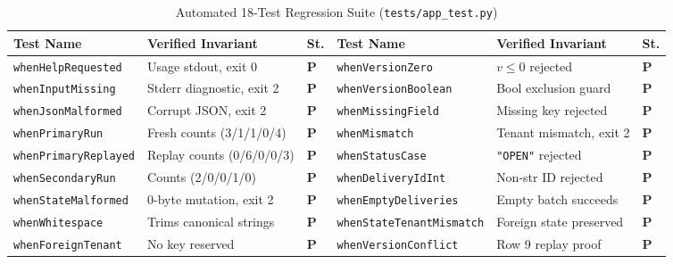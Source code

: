 \documentclass[10pt,a4paper]{article}
\begin{document}
\begin{table}[htbp]
\centering\footnotesize
\renewcommand{\arraystretch}{1.1}
\caption{Automated 18-Test Regression Suite (\texttt{tests/app\_test.py})}
\label{tab:test_results}
\begin{tabularx}{\textwidth}{@{}lXl|lXl@{}}
\toprule
\textbf{Test Name} & \textbf{Verified Invariant} & \textbf{St.} & \textbf{Test Name} & \textbf{Verified Invariant} & \textbf{St.} \\ \midrule
\texttt{whenHelpRequested} & Usage stdout, exit 0 & \textcolor{ggreen}{\textbf{P}} & \texttt{whenVersionZero} & $v \le 0$ rejected & \textcolor{ggreen}{\textbf{P}} \\
\texttt{whenInputMissing} & Stderr diagnostic, exit 2 & \textcolor{ggreen}{\textbf{P}} & \texttt{whenVersionBoolean} & Bool exclusion guard & \textcolor{ggreen}{\textbf{P}} \\
\texttt{whenJsonMalformed} & Corrupt JSON, exit 2 & \textcolor{ggreen}{\textbf{P}} & \texttt{whenMissingField} & Missing key rejected & \textcolor{ggreen}{\textbf{P}} \\
\texttt{whenPrimaryRun} & Fresh counts (3/1/1/0/4) & \textcolor{ggreen}{\textbf{P}} & \texttt{whenMismatch} & Tenant mismatch, exit 2 & \textcolor{ggreen}{\textbf{P}} \\
\texttt{whenPrimaryReplayed} & Replay counts (0/6/0/0/3) & \textcolor{ggreen}{\textbf{P}} & \texttt{whenStatusCase} & \texttt{"OPEN"} rejected & \textcolor{ggreen}{\textbf{P}} \\
\texttt{whenSecondaryRun} & Counts (2/0/0/1/0) & \textcolor{ggreen}{\textbf{P}} & \texttt{whenDeliveryIdInt} & Non-str ID rejected & \textcolor{ggreen}{\textbf{P}} \\
\texttt{whenStateMalformed} & 0-byte mutation, exit 2 & \textcolor{ggreen}{\textbf{P}} & \texttt{whenEmptyDeliveries} & Empty batch succeeds & \textcolor{ggreen}{\textbf{P}} \\
\texttt{whenWhitespace} & Trims canonical strings & \textcolor{ggreen}{\textbf{P}} & \texttt{whenStateTenantMismatch} & Foreign state preserved & \textcolor{ggreen}{\textbf{P}} \\
\texttt{whenForeignTenant} & No key reserved & \textcolor{ggreen}{\textbf{P}} & \texttt{whenVersionConflict} & Row 9 replay proof & \textcolor{ggreen}{\textbf{P}} \\ \bottomrule
\end{tabularx}
\end{table}
\end{document}
